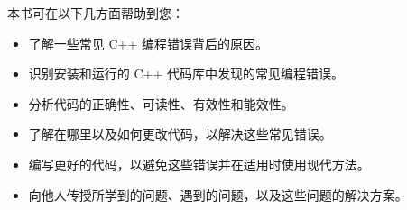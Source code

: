 
本书可在以下几方面帮助到您：

\begin{itemize}
\item
了解一些常见 C++ 编程错误背后的原因。

\item
识别安装和运行的 C++ 代码库中发现的常见编程错误。

\item
分析代码的正确性、可读性、有效性和能效性。

\item
了解在哪里以及如何更改代码，以解决这些常见错误。

\item
编写更好的代码，以避免这些错误并在适用时使用现代方法。

\item
向他人传授所学到的问题、遇到的问题，以及这些问题的解决方案。
\end{itemize}
